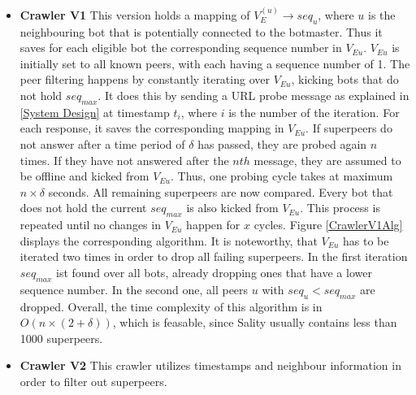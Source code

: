 \documentclass{article}
\begin{document}
\begin{itemize}
    \item \textbf{Crawler V1}  This version holds a mapping of $V_{E}^{(u)} \rightarrow seq_{u}$, where $u$ is the neighbouring bot that is potentially connected to the botmaster. Thus it  saves for each eligible bot the corresponding sequence number in $V_{Eu}$.  $V_{Eu}$ is initially set to all known peers, with each having a sequence number of 1. The peer filtering happens by constantly iterating over $V_{Eu}$, kicking bots that do not hold $seq_{max}$. It does this by sending a URL probe message as explained in \ref{System Design} at timestamp $t_{i}$, where $i$ is the number of the iteration. For each response, it saves the corresponding mapping in $V_{Eu}$. If superpeers do not answer after a time period of $\delta$ has passed, they are probed again $n$ times. If they have not answered after the $nth$ message, they are assumed to be offline and kicked from $V_{Eu}$. Thus, one probing cycle takes at maximum $n \times \delta$ seconds. All remaining superpeers are now compared. Every bot that does not hold the current $seq_{max}$ is also kicked from $V_{Eu}$. This process is repeated until no changes in $V_{Eu}$ happen for $x$ cycles. Figure \ref{CrawlerV1Alg} displays the corresponding algorithm. It is noteworthy, that $V_{Eu}$ has to be iterated two times in order to drop all failing superpeers. In the first iteration $seq_{max}$ ist found over all bots, already dropping ones that have a lower sequence number. In the second one, all peers $u$ with $seq_{u} < seq_{max}$ are dropped. Overall, the time complexity of this algorithm is in $O(n \times (2 + \delta))$, which is feasable, since Sality usually contains less than 1000 superpeers.
    
    \item \textbf{Crawler V2}  This crawler utilizes timestamps and neighbour information in order to filter out superpeers. 
    

\end{itemize}
\end{document}
